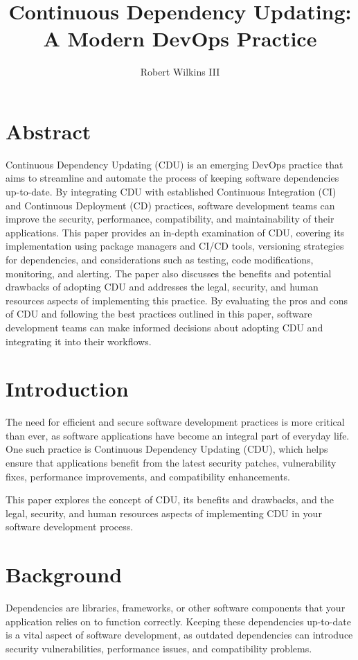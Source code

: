 \documentclass[10pt]{article}
\title{Continuous Dependency Updating: A Modern DevOps Practice}
\author{Robert Wilkins III}
\date{}
\begin{document}
\maketitle


\section{Abstract}
Continuous Dependency Updating (CDU) is an emerging DevOps practice that aims to streamline and automate the process of keeping software dependencies up-to-date. By integrating CDU with established Continuous Integration (CI) and Continuous Deployment (CD) practices, software development teams can improve the security, performance, compatibility, and maintainability of their applications. This paper provides an in-depth examination of CDU, covering its implementation using package managers and CI/CD tools, versioning strategies for dependencies, and considerations such as testing, code modifications, monitoring, and alerting. The paper also discusses the benefits and potential drawbacks of adopting CDU and addresses the legal, security, and human resources aspects of implementing this practice. By evaluating the pros and cons of CDU and following the best practices outlined in this paper, software development teams can make informed decisions about adopting CDU and integrating it into their workflows.

\section{Introduction}
The need for efficient and secure software development practices is more critical than ever, as software applications have become an integral part of everyday life. One such practice is Continuous Dependency Updating (CDU), which helps ensure that applications benefit from the latest security patches, vulnerability fixes, performance improvements, and compatibility enhancements.

This paper explores the concept of CDU, its benefits and drawbacks, and the legal, security, and human resources aspects of implementing CDU in your software development process.

\section{Background}
Dependencies are libraries, frameworks, or other software components that your application relies on to function correctly. Keeping these dependencies up-to-date is a vital aspect of software development, as outdated dependencies can introduce security vulnerabilities, performance issues, and compatibility problems.
\end{document}

